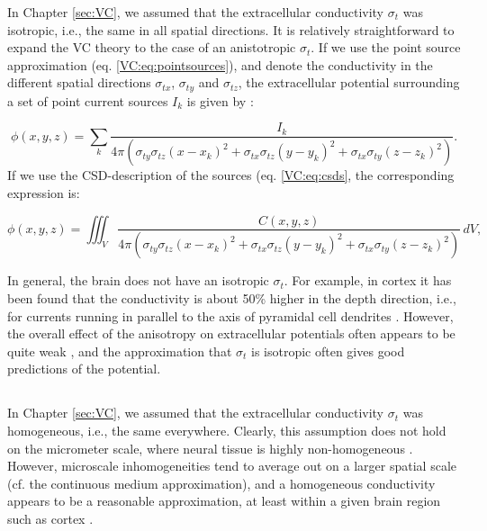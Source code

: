 In Chapter \ref{sec:VC}, we assumed that the extracellular conductivity $\sigma_t$ was isotropic, i.e., the same in all spatial directions. It is relatively straightforward to expand the VC theory to the case of an anistotropic $\sigma_t$. If we use the point source approximation (eq. \ref{VC:eq:pointsources}), and denote the conductivity in the different spatial directions $\sigma_{tx}$, $\sigma_{ty}$ and $\sigma_{tz}$, the extracellular potential surrounding a set of point current sources $I_k$ is given by \citep{nicholson1975, Pettersen2012}:

\begin{equation}
\phi(x,y,z) = \sum_k \frac{I_k}{4\pi(\sigma_{ty}\sigma_{tz} (x-x_k)^2 + \sigma_{tx}\sigma_{tz} (y-y_k)^2 + \sigma_{tx}\sigma_{ty} (z-z_k)^2)}.
\label{Sigma:eq:Panisos}
\end{equation}
If we use the CSD-description of the sources (eq. \ref{VC:eq:csds}, the corresponding expression is:

\begin{equation}
\phi(x,y,z) = \iiint_V \frac{C(x,y,z)}{4\pi(\sigma_{ty}\sigma_{tz} (x-x_k)^2 + \sigma_{tx}\sigma_{tz} (y-y_k)^2 + \sigma_{tx}\sigma_{ty} (z-z_k)^2)} \, dV, 
\label{Sigma:eq:Canisos}
\end{equation}

In general, the brain does not have an isotropic $\sigma_t$. For example, in cortex it has been found that the conductivity is about 50\% higher in the depth direction, i.e., for currents running in parallel to the axis of pyramidal cell dendrites \citep{Goto2010}. However, the overall effect of the anisotropy on extracellular potentials often appears to be quite weak \citep{Ness2015, Miceli2017}, and the approximation that $\sigma_t$ is isotropic often gives good predictions of the potential.


\subsection{}
\label{sec:Sigma:nonhomo}

In Chapter \ref{sec:VC}, we assumed that the extracellular conductivity $\sigma_t$ was homogeneous, i.e., the same everywhere. Clearly, this assumption does not hold on the micrometer scale, where neural tissue is highly non-homogeneous \citep{Nicholson1998}. However, microscale inhomogeneities tend to average out on a larger spatial scale (cf. the continuous medium approximation), and a homogeneous conductivity appears to be a reasonable approximation, at least within a given brain region such as cortex \citep{Logothetis2007}. 

